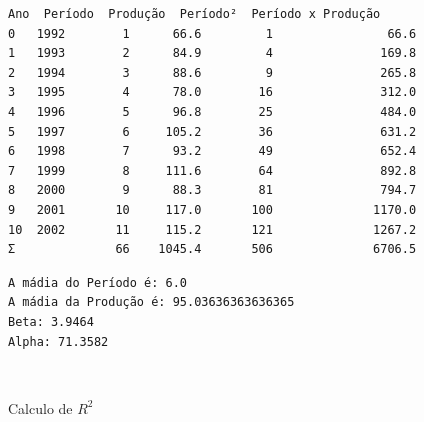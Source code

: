 \documentclass[11pt]{article}
\begin{document}
    
    \begin{Verbatim}[commandchars=\\\{\}]
     Ano  Período  Produção  Período²  Período x Produção
0   1992        1      66.6         1                66.6
1   1993        2      84.9         4               169.8
2   1994        3      88.6         9               265.8
3   1995        4      78.0        16               312.0
4   1996        5      96.8        25               484.0
5   1997        6     105.2        36               631.2
6   1998        7      93.2        49               652.4
7   1999        8     111.6        64               892.8
8   2000        9      88.3        81               794.7
9   2001       10     117.0       100              1170.0
10  2002       11     115.2       121              1267.2
Σ              66    1045.4       506              6706.5
    \end{Verbatim}

    
    \begin{Verbatim}[commandchars=\\\{\}]
A mádia do Período é: 6.0
A mádia da Produção é: 95.03636363636365
Beta: 3.9464
Alpha: 71.3582
    \end{Verbatim}

    \begin{center}
    \end{center}
    { \hspace*{\fill} \\}
    
    Calculo de \(R^2\)
\end{document}
